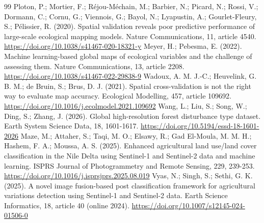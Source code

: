 \documentclass[11pt,a4paper]{article}
\begin{document}
\begin{thebibliography}{99}
 Ploton, P.; Mortier, F.; Réjou-Méchain, M.; Barbier, N.; Picard, N.; Rossi, V.; Dormann, C.; Cornu, G.; Viennois, G.; Bayol, N.; Lyapustin, A.; Gourlet-Fleury, S.; Pélissier, R. (2020). Spatial validation reveals poor predictive performance of large-scale ecological mapping models. Nature Communications, 11, article 4540. \url{https://doi.org/10.1038/s41467-020-18321-y}
 Meyer, H.; Pebesma, E. (2022). Machine learning-based global maps of ecological variables and the challenge of assessing them. Nature Communications, 13, article 2208. \url{https://doi.org/10.1038/s41467-022-29838-9}
 Wadoux, A. M. J.-C.; Heuvelink, G. B. M.; de Bruin, S.; Brus, D. J. (2021). Spatial cross-validation is not the right way to evaluate map accuracy. Ecological Modelling, 457, article 109692. \url{https://doi.org/10.1016/j.ecolmodel.2021.109692}
 Wang, L.; Liu, S.; Song, W.; Ding, S.; Zhang, J. (2026). Global high-resolution forest disturbance type dataset. Earth System Science Data, 18, 1601-1617. \url{https://doi.org/10.5194/essd-18-1601-2026}
 Maze, M.; Attaher, S.; Taqi, M. O.; Elsawy, R.; Gad El-Moula, M. M. H.; Hashem, F. A.; Moussa, A. S. (2025). Enhanced agricultural land use/land cover classification in the Nile Delta using Sentinel-1 and Sentinel-2 data and machine learning. ISPRS Journal of Photogrammetry and Remote Sensing, 229, 239-253. \url{https://doi.org/10.1016/j.isprsjprs.2025.08.019}
 Vyas, N.; Singh, S.; Sethi, G. K. (2025). A novel image fusion-based post classification framework for agricultural variations detection using Sentinel-1 and Sentinel-2 data. Earth Science Informatics, 18, article 40 (online 2024). \url{https://doi.org/10.1007/s12145-024-01506-0}
\end{thebibliography}
\end{document}
